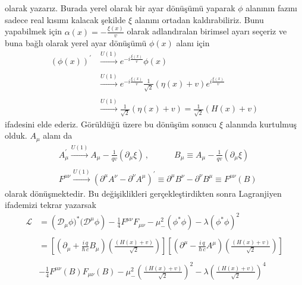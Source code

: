 olarak yazarız. Burada yerel olarak bir ayar dönüşümü yaparak $\phi$ alanının fazını sadece real kısımı kalacak şekilde $\xi$ alanını ortadan kaldırabiliriz. Bunu yapabilmek için $\alpha(x) = - \frac{\xi (x)}{v} $ olarak adlandıralan birimsel ayarı seçeriz ve buna bağlı olarak yerel ayar dönüşümü $\phi(x)$ alanı için
\begin{equation} \label{abe8}
\begin{aligned}
\left(\phi(x)\right)^{'} &\xrightarrow{U(1)}   e^{-i \frac{\xi (x)}{v}} \phi(x) \\
\\
& \xrightarrow{U(1)} e^{-i \frac{\xi (x)}{v}} \frac{1}{\sqrt{2}} \left( \eta (x) + v \right) e^{i \frac{\xi (x)}{v}} \\
\\
& \xrightarrow{U(1)} \frac{1}{\sqrt{2}} \left( \eta (x) + v \right) = \frac{1}{\sqrt{2}} \left( H(x) + v \right)
\end{aligned}
\end{equation}
ifadesini elde ederiz. Görüldüğü üzere bu dönüşüm sonucu $\xi$ alanında kurtulmuş olduk. $A_{\mu}$ alanı da
\begin{equation} \label{abe9}
\begin{aligned}
&A^{'}_{\mu} \xrightarrow{U(1)} A_{\mu} - \frac{1}{q v}(\partial_{\mu} \xi)\,, \qquad\quad B_{\mu} \equiv A_{\mu} - \frac{1}{q v}(\partial_{\mu} \xi) \\
\\
& F^{\mu \nu} \xrightarrow{U(1)} \left( \partial^{\mu} A^{\nu} - \partial^{\nu} A^{\mu} \right)^{'} \equiv \partial^{\mu} B^{\nu} - \partial^{\nu} B^{\mu} \equiv F^{\mu \nu}(B)
\end{aligned}
\end{equation}
olarak dönüşmektedir. Bu değişiklikleri gerçekleştirdikten sonra Lagranjiyen ifademizi tekrar yazarsak
\begin{equation*}
\begin{aligned}
\mathcal{L} &= \left( \mathcal{D}_{\mu} \phi)^{*} (\mathcal{D}^{\mu} \phi \right) - \frac{1}{4} F^{\mu \nu} F_{\mu \nu} - \mu_{-}^{2}(\phi^{*} \phi) - \lambda (\phi^{*} \phi)^{2}\\
\\
& = \left[ \left( \partial_{\mu} + \frac{i\,q}{\hbar \, c} B_{\mu} \right) \left( \frac{\left( H(x) + v \right)}{\sqrt{2}} \right) \right] \left[ \left( \partial^{\mu} - \frac{i\,q}{\hbar \, c} A^{\mu} \right) \left( \frac{\left( H(x) + v \right)}{\sqrt{2}} \right) \right] \\
\\ 
& - \frac{1}{4} F^{\mu \nu}(B) F_{\mu \nu}(B) - \mu_{-}^{2} \left( \frac{\left( H(x) + v \right)}{\sqrt{2}} \right)^{2} - \lambda \left( \frac{\left( H(x) + v \right)}{\sqrt{2}} \right)^{4}\\
\\
\end{aligned}
\end{equation*}
